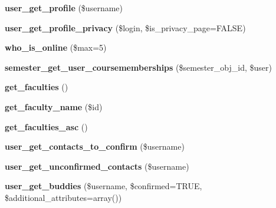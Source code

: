 \begin{DoxyCompactItemize}
\item 
\hypertarget{classlms__steam_a497a0c840860ae7fcaf0a9689bb3c7a3}{
{\bfseries user\_\-get\_\-profile} (\$username)}
\label{classlms__steam_a497a0c840860ae7fcaf0a9689bb3c7a3}

\item 
\hypertarget{classlms__steam_a6ed64745c58dcd8a041aba0df98f92f9}{
{\bfseries user\_\-get\_\-profile\_\-privacy} (\$login, \$is\_\-privacy\_\-page=FALSE)}
\label{classlms__steam_a6ed64745c58dcd8a041aba0df98f92f9}

\item 
\hypertarget{classlms__steam_a2b5da8f70a17849f67886841f41ee78c}{
{\bfseries who\_\-is\_\-online} (\$max=5)}
\label{classlms__steam_a2b5da8f70a17849f67886841f41ee78c}

\item 
\hypertarget{classlms__steam_aa4c2d02748b1bab3b61d446d87b1aa23}{
{\bfseries semester\_\-get\_\-user\_\-coursememberships} (\$semester\_\-obj\_\-id, \$user)}
\label{classlms__steam_aa4c2d02748b1bab3b61d446d87b1aa23}

\item 
\hypertarget{classlms__steam_a6408d7ccf4d9882d35806b1b7b4a9f98}{
{\bfseries get\_\-faculties} ()}
\label{classlms__steam_a6408d7ccf4d9882d35806b1b7b4a9f98}

\item 
\hypertarget{classlms__steam_a4c8c57a534185950d33a6828af4052ba}{
{\bfseries get\_\-faculty\_\-name} (\$id)}
\label{classlms__steam_a4c8c57a534185950d33a6828af4052ba}

\item 
\hypertarget{classlms__steam_a4d7d26c5ff4db3c29535d9f37989dbd2}{
{\bfseries get\_\-faculties\_\-asc} ()}
\label{classlms__steam_a4d7d26c5ff4db3c29535d9f37989dbd2}

\item 
\hypertarget{classlms__steam_aa46531b0f367bbd9bd2a716bb174aaea}{
{\bfseries user\_\-get\_\-contacts\_\-to\_\-confirm} (\$username)}
\label{classlms__steam_aa46531b0f367bbd9bd2a716bb174aaea}

\item 
\hypertarget{classlms__steam_a11987aaf2284f7ed7dab95840e06e90a}{
{\bfseries user\_\-get\_\-unconfirmed\_\-contacts} (\$username)}
\label{classlms__steam_a11987aaf2284f7ed7dab95840e06e90a}

\item 
\hypertarget{classlms__steam_a9af23cdac03043db434dea6e9c19e1f1}{
{\bfseries user\_\-get\_\-buddies} (\$username, \$confirmed=TRUE, \$additional\_\-attributes=array())}
\label{classlms__steam_a9af23cdac03043db434dea6e9c19e1f1}


\end{DoxyCompactItemize}
